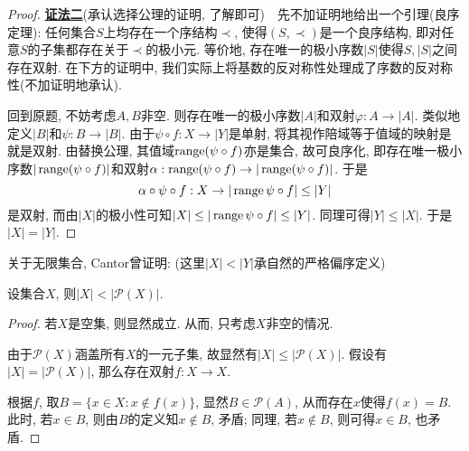 \begin{proof}
	\underline{\textbf{证法二}}(承认选择公理的证明, 了解即可)~~先不加证明地给出一个引理(良序定理): 任何集合$S$上均存在一个序结构$\prec$, 使得$(S,\prec)$是一个良序结构, 即对任意$S$的子集都存在关于$\prec$的极小元. 等价地, 存在唯一的极小序数$|S|$使得$S,|S|$之间存在双射. 在下方的证明中, 我们实际上将基数的反对称性处理成了序数的反对称性(不加证明地承认). 
	
	回到原题, 不妨考虑$A,B$非空. 则存在唯一的极小序数$|A|$和双射$\varphi :A \to |A|$. 类似地定义$|B|$和$\psi :B \to |B|$. 由于$\psi \circ f:X \to |Y|$是单射, 将其视作陪域等于值域的映射是就是双射. 由替换公理, 其值域$\operatorname{range} (\psi \circ f)$亦是集合, 故可良序化, 即存在唯一极小序数$|\operatorname{range} (\psi \circ f)|$和双射$\alpha :\operatorname{range} (\psi \circ f) \to |\operatorname{range} (\psi \circ f)|$. 于是$$\alpha \circ \psi \circ f:X \to |\operatorname{range} \psi \circ f| \leq |Y|$$
	是双射, 而由$|X|$的极小性可知$|X| \leq |\operatorname{range} \psi \circ f| \leq |Y|$. 同理可得$|Y| \leq |X|$. 于是$|X|=|Y|$. 
\end{proof}



关于无限集合, Cantor曾证明: (这里$|X|<|Y|$承自然的严格偏序定义)

\begin{theorem}{}
	设集合$X$, 则$|X|< |\mathcal{P}(X)|$.
\end{theorem}
\begin{proof}
	若$X$是空集, 则显然成立. 从而, 只考虑$X$非空的情况. 
	
	由于$\mathcal{P}(X)$涵盖所有$X$的一元子集, 故显然有$|X| \leq |\mathcal{P}(X)|$. 假设有$|X| = | \mathcal{P}(X)|$, 那么存在双射$f: X \to X$. 
	
	根据$f$, 取$B=\{ x \in X: x \notin f(x) \}$, 显然$B \in \mathcal{P}(A)$, 从而存在$x$使得$f(x)=B$. 此时, 若$x \in B$, 则由$B$的定义知$x \notin B$, 矛盾; 同理, 若$x \notin B$, 则可得$x \in B$, 也矛盾. 
\end{proof}


